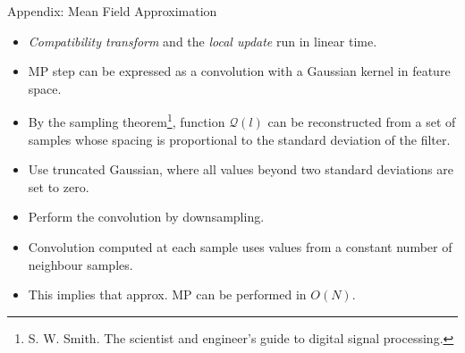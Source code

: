 \documentclass{beamer}
\begin{document}
\begin{frame}{Appendix: Mean Field Approximation}
\begin{itemize}
	\item \textit{Compatibility transform} and the \textit{local update} run in linear time.
	\item MP step can be expressed as a convolution with a Gaussian kernel in feature space.
	\item By the sampling theorem\footnote{S. W. Smith. The scientist and engineer’s guide to digital signal processing.}, function ${\mathcal{Q}(l)}$ can be reconstructed from a set of samples whose spacing is proportional to the standard deviation of the filter.
	\item Use truncated Gaussian, where all values beyond two standard deviations are set to zero.
	\item Perform the convolution by downsampling.
	\item Convolution computed at each sample uses values from a constant number of neighbour samples.
	\item This implies that approx. MP can be performed in $O(N)$.
\end{itemize}
\end{frame}
\end{document}
